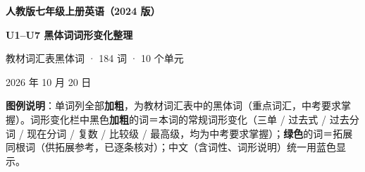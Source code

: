 \documentclass[UTF8,a4paper,11pt]{ctexart}
\begin{document}
\begin{center}
{\sffamily\bfseries\fontsize{20pt}{26pt}\selectfont\color{headblue} 人教版七年级上册英语（2024 版）\par}
\vspace{2pt}
{\sffamily\bfseries\fontsize{17pt}{22pt}\selectfont\color{headblue} U1--U7 黑体词词形变化整理\par}
\vspace{7pt}
{\small\color{textgray} 教材词汇表黑体词 · 184 词 · 10 个单元\par}
\vspace{2pt}
{\scriptsize\color{textgray} 2026 年 10 月 20 日\par}
\end{center}
\vspace{2pt}

{\small\color{textgray}\textbf{图例说明}：单词列全部\textbf{加粗}，为教材词汇表中的黑体词（重点词汇，中考要求掌握）。词形变化栏中黑色\textbf{加粗}的词＝本词的常规词形变化（三单 / 过去式 / 过去分词 / 现在分词 / 复数 / 比较级 / 最高级，均为中考要求掌握）；\textbf{\color{cngreen}绿色}的词＝拓展同根词（供拓展参考，已逐条核对）；中文（含词性、词形说明）统一用蓝色显示。}

\vspace{4pt}
\end{document}
